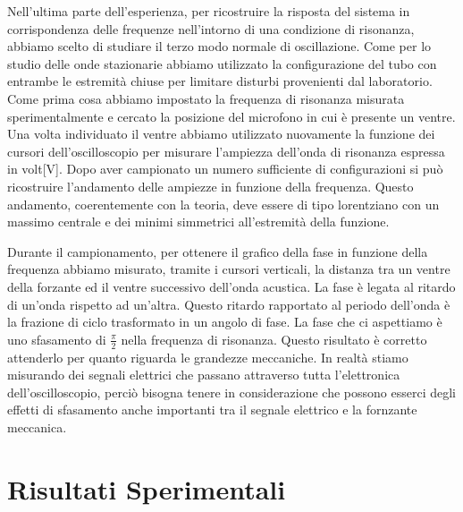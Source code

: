 \documentclass[11pt]{article}
\begin{document}
Nell'ultima parte dell'esperienza, per ricostruire la risposta del sistema in corrispondenza delle frequenze nell'intorno di una condizione di risonanza, abbiamo scelto di studiare il terzo modo normale di oscillazione. Come per lo studio delle onde stazionarie abbiamo utilizzato la configurazione del tubo con entrambe le estremità chiuse per limitare disturbi provenienti dal laboratorio. Come prima cosa abbiamo impostato la frequenza di risonanza misurata sperimentalmente e cercato la posizione del microfono in cui è presente un ventre. Una volta individuato il ventre abbiamo utilizzato nuovamente la funzione dei cursori dell'oscilloscopio per misurare l'ampiezza  dell'onda di risonanza espressa in volt[V]. Dopo aver campionato un numero sufficiente di configurazioni si può ricostruire l'andamento delle ampiezze in funzione della frequenza. Questo andamento, coerentemente con la teoria, deve essere di tipo lorentziano con un massimo centrale e dei minimi simmetrici all'estremità della funzione. 

Durante il campionamento, per ottenere il grafico della fase in funzione della frequenza abbiamo misurato, tramite i cursori verticali, la distanza tra un ventre della forzante ed il ventre successivo dell'onda acustica. La fase è legata al ritardo di un'onda rispetto ad un'altra. Questo ritardo rapportato al periodo dell'onda è la frazione di ciclo trasformato in un angolo di fase. La fase che ci aspettiamo è uno sfasamento di $\frac{\pi}{2}$ nella frequenza di risonanza. Questo risultato è corretto attenderlo per quanto riguarda le grandezze meccaniche. In realtà stiamo misurando dei segnali elettrici che passano attraverso tutta l'elettronica dell'oscilloscopio, perciò bisogna tenere in considerazione che possono esserci degli effetti di sfasamento anche importanti tra il segnale elettrico e la fornzante meccanica.

\section{Risultati Sperimentali}
\end{document}
